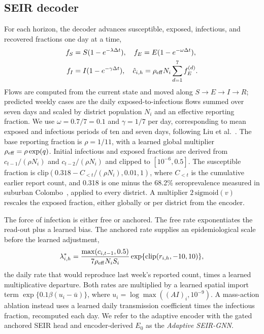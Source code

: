 \documentclass[conference]{IEEEtran}
\begin{document}
\subsection{SEIR decoder}
For each horizon, the decoder advances susceptible, exposed, infectious, and recovered fractions one day at a time,
\begin{equation}
\begin{aligned}
f_S&=S(1-e^{-\lambda\Delta t}),\quad f_E=E(1-e^{-\omega\Delta t}),\\
f_I&=I(1-e^{-\gamma\Delta t}),\quad
\hat c_{i,h}=\rho_{\rm eff}N_i\sum_{d=1}^{7} f_E^{(d)}.
\end{aligned}
\label{eq:seir}
\end{equation}
Flows are computed from the current state and moved along $S\rightarrow E\rightarrow I\rightarrow R$; predicted weekly cases are the daily exposed-to-infectious flows summed over seven days and scaled by district population $N_i$ and an effective reporting fraction.
We use $\omega=0.7/7=0.1$ and $\gamma=1/7$ per day, corresponding to mean exposed and infectious periods of ten and seven days, following Liu et al.~\cite{liu2025seirlstm}. %
The base reporting fraction is $\rho=1/11$, with a learned global multiplier $\rho_{\rm eff}=\rho\exp(q)$. %
Initial infectious and exposed fractions are derived from $c_{t-1}/(\rho N_i)$ and $c_{t-2}/(\rho N_i)$ and clipped to $[10^{-6},0.5]$. %
The susceptible fraction is $\mathrm{clip}(0.318-C_{<t}/(\rho N_i),0.01,1)$, where $C_{<t}$ is the cumulative earlier report count, and 0.318 is one minus the 68.2\% seroprevalence measured in suburban Colombo~\cite{jeewandara2015sero}, applied to every district. %
A multiplier $2\,\mathrm{sigmoid}(v)$ rescales the exposed fraction, either globally or per district from the encoder. %

The force of infection is either free or anchored.
The free rate exponentiates the read-out plus a learned bias.
The anchored rate supplies an epidemiological scale before the learned adjustment,
\begin{equation}
\lambda^*_{i,h}=\frac{\max(c_{i,t-1},0.5)}{7\rho_{\rm eff}N_iS_i}
\exp\{\mathrm{clip}(r_{i,h},-10,10)\},
\label{eq:anchor}
\end{equation}
the daily rate that would reproduce last week's reported count, times a learned multiplicative departure.
Both rates are multiplied by a learned spatial import term $\exp\{0.1\beta(u_i-\bar u)\}$, where $u_i=\log\max((AI)_i,10^{-9})$. %
A mass-action ablation instead uses a learned daily transmission coefficient times the infectious fraction, recomputed each day.
We refer to the adaptive encoder with the gated anchored SEIR head and encoder-derived $E_0$ as the \emph{Adaptive SEIR-GNN}.
\end{document}
